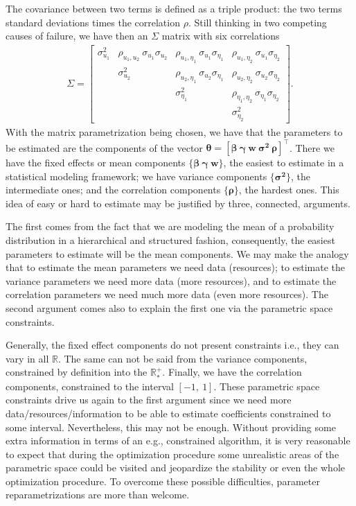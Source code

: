 The covariance between two terms is defined as a triple product: the two
terms standard deviations times the correlation \(\rho\). Still
thinking in two competing causes of failure, we have then an \(\Sigma\)
matrix with six correlations
\begin{align*}
 \Sigma = \begin{bmatrix}
           \sigma_{u_{1}}^{2}&
           \rho_{u_{1},u_{2}}~\sigma_{u_{1}}\sigma_{u_{2}}&
           \rho_{u_{1},\eta_{1}}~\sigma_{u_{1}}\sigma_{\eta_{1}}&
           \rho_{u_{1},\eta_{2}}~\sigma_{u_{1}}\sigma_{\eta_{2}}\\
           &\sigma_{u_{2}}^{2}&
           \rho_{u_{2},\eta_{1}}~\sigma_{u_{2}}\sigma_{\eta_{1}}&
           \rho_{u_{2},\eta_{2}}~\sigma_{u_{2}}\sigma_{\eta_{2}}\\
           &&\sigma_{\eta_{1}}^{2}&
           \rho_{\eta_{1},\eta_{2}}~\sigma_{\eta_{1}}\sigma_{\eta_{2}}\\
           &&&\sigma_{\eta_{2}}^{2}
          \end{bmatrix}.
\end{align*}
With the matrix parametrization being chosen, we have that the
parameters to be estimated are the components of the vector
\(\bm{\theta} = [\bm{\beta}~ \bm{\gamma}~\bm{w}~\bm{\sigma^{2}}~
\bm{\rho}]^{\top}\). There we have the fixed effects or mean components
\(\{\bm{\beta}~\bm{\gamma}~\bm{w}\}\), the easiest to estimate in a
statistical modeling framework; we have variance components
\(\{\bm{\sigma^{2}}\}\), the intermediate ones; and the correlation
components \(\{\bm{\rho}\}\), the hardest ones. This idea of easy or
hard to estimate may be justified by three, connected, arguments.

The first comes from the fact that we are modeling the mean of a
probability distribution in a hierarchical and structured fashion,
consequently, the easiest parameters to estimate will be the mean
components. We may make the analogy that to estimate the mean parameters
we need data (resources); to estimate the variance parameters we need
more data (more resources), and to estimate the correlation parameters
we need much more data (even more resources). The second argument comes
also to explain the first one via the parametric space constraints.

Generally, the fixed effect components do not present constraints i.e.,
they can vary in all \(\mathbb{R}\). The same can not be said from the
variance components, constrained by definition into the
\(\mathbb{R}_{\ast}^{+}\). Finally, we have the correlation components,
constrained to the interval \([-1,~1]\). These parametric space
constraints drive us again to the first argument since we need more
data/resources/information to be able to estimate coefficients
constrained to some interval. Nevertheless, this may not be enough.
Without providing some extra information in terms of an e.g.,
constrained algorithm, it is very reasonable to expect that during the
optimization procedure some unrealistic areas of the parametric space
could be visited and jeopardize the stability or even the whole
optimization procedure. To overcome these possible difficulties,
parameter reparametrizations are more than welcome.

